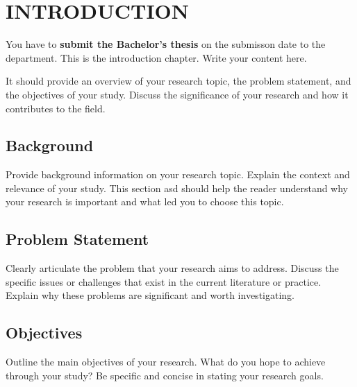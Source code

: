 \chapter{INTRODUCTION}

You have to \textbf{submit the Bachelor's thesis} on the submisson date to the department. This is the introduction chapter. Write your content here.

It should provide an overview of your research topic, the problem statement, and the objectives of your study. Discuss the significance of your research and how it contributes to the field.
\section{Background}
Provide background information on your research topic. Explain the context and relevance of your study. This section
asd should help the reader understand why your research is important and what led you to choose this topic.
\section{Problem Statement}
Clearly articulate the problem that your research aims to address. Discuss the specific issues or challenges that exist in the current literature or practice. Explain why these problems are significant and worth investigating.
\section{Objectives}
Outline the main objectives of your research. What do you hope to achieve through your study? Be specific and concise in stating your research goals.